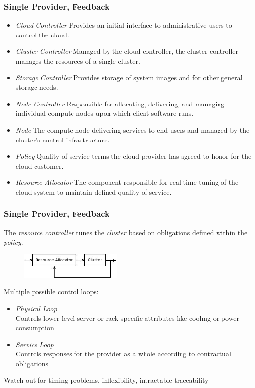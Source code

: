 \documentclass[t, 10pt]{beamer}
\begin{document}
\begin{frame}
\frametitle{Single Provider, Feedback}

\begin{itemize}
\item \textit{Cloud Controller} Provides an initial interface to administrative users to control the cloud.
\item \textit{Cluster Controller} Managed by the cloud controller, the cluster controller manages the resources of a single cluster.
\item \textit{Storage Controller} Provides storage of system images and for other general storage needs.
\item \textit{Node Controller} Responsible for allocating, delivering, and managing individual compute nodes upon which client software runs.
\item \textit{Node} The compute node delivering services to end users and managed by the cluster's control infrastructure.
\item \textit{Policy} Quality of service terms the cloud provider has agreed to honor for the cloud customer.
\item \textit{Resource Allocator} The component responsible for real-time tuning of the cloud system to maintain defined quality of service.
\end{itemize}

\end{frame}

\begin{frame}
\frametitle{Single Provider, Feedback}
The \textit{resource controller} tunes the \textit{cluster} based on obligations defined within the \textit{policy}. \\

\begin{figure}
\includegraphics[width = 5cm]{feedback}
\end{figure}

Multiple possible control loops:
\begin{itemize}
\item \textit{Physical Loop} \\
Controls lower level server or rack specific attributes like cooling or power consumption
\item \textit{Service Loop} \\
Controls responses for the provider as a whole according to contractual obligations
\end{itemize}

Watch out for timing problems, inflexibility, intractable traceability

\end{frame}
\end{document}
